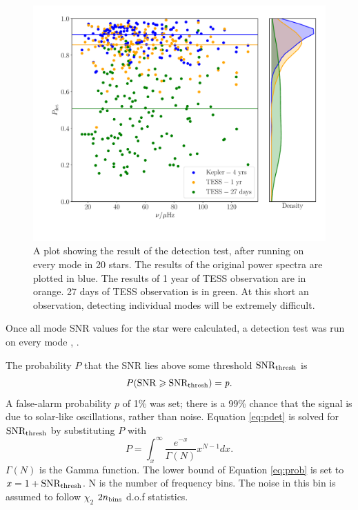\documentclass[a4paper,fleqn,usenatbib,useAMS]{mnras}
\begin{document}
\begin{figure}
	\centering
	\includegraphics[scale=0.3]{DetTest_Diagnostic_plot3.pdf}
	\caption{A plot showing the result of the detection test, after running on every mode in 20 stars. The results of the original power spectra are plotted in blue. The results of 1 year of TESS observation are in orange. 27 days of TESS observation is in green. At this short an observation, detecting individual modes will be extremely difficult.}	
	\label{modes}
\end{figure}

Once all mode SNR values for the star were calculated, a detection test was run on every mode \citep{chaplin_predicting_2011}, \citep{campante_asteroseismic_2016}.

The probability $P$ that the SNR lies above some threshold ${\rm SNR_{thresh}}$ is
\begin{equation}
\label{eq:pdet}
P(\rm SNR \geq SNR_{thresh}) = \it p .
\end{equation}
A false-alarm probability $p$ of 1\% was set; there is a 99\% chance that the signal is due to solar-like oscillations, rather than noise. Equation \ref{eq:pdet} is solved for $\rm SNR_{thresh}$ by substituting $P$ with
\begin{equation}
\label{eq:prob}
P = \int_{x}^{\infty} \frac{e^{-x}}{\Gamma(N)} x^{N-1} dx .
\end{equation}
$\Gamma(N)$ is the Gamma function. The lower bound of Equation \ref{eq:prob} is set to $x=1+{\rm SNR_{thresh}}$. N is the number of frequency bins. The noise in this bin is assumed to follow $\chi_{2}$ $2n_{\rm bins}$ d.o.f statistics. 
\end{document}
